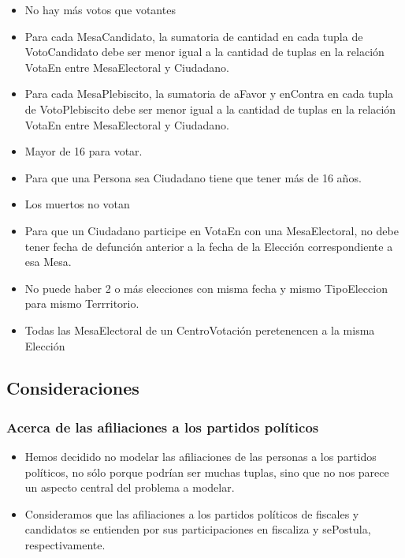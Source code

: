 \begin{itemize}
\item{No hay más votos que votantes}

\item{Para cada MesaCandidato, la sumatoria de cantidad en cada tupla de VotoCandidato debe ser menor igual a la cantidad de tuplas en la relación VotaEn entre MesaElectoral y Ciudadano.}

\item{Para cada MesaPlebiscito, la sumatoria de aFavor y enContra en cada tupla de VotoPlebiscito debe ser menor igual a la cantidad de tuplas en la relación VotaEn entre MesaElectoral y Ciudadano.}

\item{Mayor de 16 para votar.}

\item{Para que una Persona sea Ciudadano tiene que tener más de 16 años.}

\item{Los muertos no votan}

\item{Para que un Ciudadano participe en VotaEn con una MesaElectoral, no debe tener fecha de defunción anterior a la fecha de la Elección correspondiente a esa Mesa.}

\item{No puede haber 2 o más  elecciones con misma fecha y mismo TipoEleccion para mismo Terrritorio.}

\item{Todas las MesaElectoral de un CentroVotación peretenencen a la misma Elección}

\end{itemize}


\subsection{Consideraciones}

\subsubsection{Acerca de las afiliaciones a los partidos políticos}

\begin{itemize}
\item{Hemos decidido no modelar las afiliaciones de las personas a los partidos políticos, no sólo porque podrían ser muchas tuplas, sino que no nos parece un aspecto central del problema a modelar.}

\item{Consideramos que las afiliaciones a los partidos políticos de fiscales y candidatos se entienden por sus participaciones en fiscaliza y sePostula, respectivamente.}
\end{itemize}

